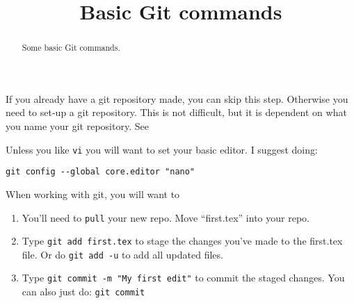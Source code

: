 \documentclass{ximera}
\title{Basic Git commands}
\begin{document}
\begin{abstract}
  Some basic Git commands.
\end{abstract}

If you already have a git repository made, you can skip this
step. Otherwise you need to set-up a git repository. This is not
difficult, but it is dependent on what you name your git
repository. See

Unless you like \verb|vi| you will want to set your basic editor. I suggest doing:

\begin{verbatim}
git config --global core.editor "nano"
\end{verbatim}

When working with git, you will want to
  \begin{enumerate}
\item You'll need to \verb!pull! your new repo. Move ``first.tex'' into your repo. 
\item Type \verb!git add first.tex! to stage the changes you've made
  to the first.tex file. Or do \verb|git add -u| to add all updated
  files.
\item Type \verb!git commit -m "My first edit"! to commit the staged changes. You can also just do: \verb|git commit|
  \end{enumerate}
\end{document}
